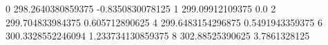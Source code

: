 0 298.2640380859375 -0.8350830078125
1 299.09912109375 0.0
2 299.704833984375 0.605712890625
4 299.6483154296875 0.5491943359375
6 300.3328552246094 1.233734130859375
8 302.88525390625 3.7861328125
